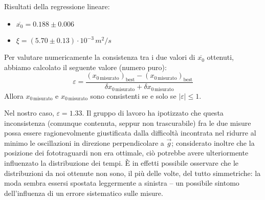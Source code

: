 \documentclass{article}
\begin{document}
Risultati della regressione lineare:
\begin{itemize}
    \item $\overline{x_0} = 0.188\pm0.006$
    \item $\xi = \left(5.70\pm0.13\right)\cdot10^{-3}\,\unit{m^2\per s}$
\end{itemize}

Per valutare numericamente la consistenza tra i due valori di $\overline{x_0}$ ottenuti,
abbiamo calcolato il seguente valore (numero puro):
\[
    \varepsilon =
    \frac{
        \left(x_{0\,\text{misurato}}\right)_\text{best} - \left(x_{0\,\text{misurato}}\right)_\text{best}
    }{
        \delta x_{0\,\text{misurato}} + \delta x_{0\,\text{misurato}}
    }
\]
Allora $x_{0\,\text{misurato}}$ e $x_{0\,\text{misurato}}$ sono consistenti se e solo se $\left|\varepsilon\right|\le1$.

Nel nostro caso, $\varepsilon = 1.33$. Il gruppo di lavoro ha ipotizzato che
questa inconsistenza (comunque contenuta, seppur non trascurabile) fra le due
misure possa essere ragionevolmente giustificata dalla difficoltà incontrata
nel ridurre al minimo le oscillazioni in direzione perpendicolare a $\vec{g}$;
considerato inoltre che la posizione dei fototraguardi non era ottimale, ciò
potrebbe avere ulteriormente influenzato la distribuzione dei tempi. È in
effetti possibile osservare che le distribuzioni da noi ottenute non sono,
il più delle volte, del tutto simmetriche: la moda sembra essersi spostata
leggermente a sinistra – un possibile sintomo dell'influenza di un
errore sistematico sulle misure.

\pagebreak
\end{document}
